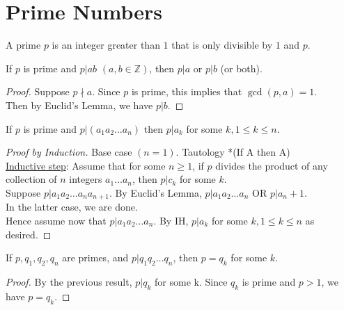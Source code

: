 \section{Prime Numbers}
    \begin{definition}
        A prime $p$ is an integer greater than $1$ that is only divisible by $1$ and $p$.
    \end{definition}

    \begin{theorem} 
        If $p$ is prime and $p|ab$ $(a,b\in\mathbb{Z})$, then $p|a$ or $p|b$ (or both).
        \begin{proof}
            Suppose $p\nmid a$. Since $p$ is prime, this implies that $\gcd(p,a)=1$. \\
            Then by Euclid's Lemma, we have $p|b$.
        \end{proof}
    \end{theorem}

    \begin{corollary}
        If $p$ is prime and $p|(a_1a_2\dots a_n)$ then 
        $p|a_k$ for some $k, 1\leq k\leq n$.
        \begin{proof} [Proof by Induction] 
            Base case $(n=1)$. Tautology *(If A then A) \\
            \underline{Inductive step}: Assume that for some $n\geq 1$, if $p$ divides the product 
            of any collection of $n$ integers $a_1\dots a_n$, then $p|c_k$ for some $k$. \\
            Suppose $p|a_1a_2\dots a_{n}a_{n+1}$.
            By Euclid's Lemma, $p|a_1a_2\dots a_n$ OR $p|a_n+1$. \\
            In the latter case, we are done. \\
            Hence assume now that $p|a_1a_2\dots a_n$. By IH, $p|a_k$ for some 
            $k, 1\leq k\leq n$ as desired.
        \end{proof}
    \end{corollary}

    \begin{corollary}
        If $p,q_1,q_2,q_n$ are primes, and $p|q_1q_2\dots q_n$, then $p=q_k$ for some $k$.
        \begin{proof}
            By the previous result, $p|q_k$ for some k. Since $q_k$ is prime and $p>1$, 
            we have $p=q_k$.
        \end{proof}
    \end{corollary}


